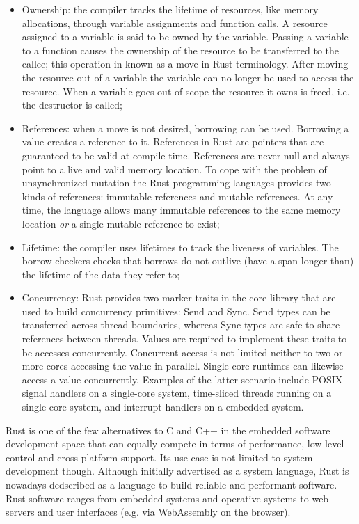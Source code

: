 \documentclass{ieeeaccess}
\begin{document}
\begin{itemize}
    \item Ownership: the compiler tracks the lifetime of resources, like memory allocations, through variable assignments and function calls. A resource assigned to a variable is said to be owned by the variable. Passing a variable to a function causes the ownership of the resource to be transferred to the callee; this operation in known as a move in Rust terminology. After moving the resource out of a variable the variable can no longer be used to access the resource. When a variable goes out of scope the resource it owns is freed, i.e. the destructor is called;
    \item References: when a move is not desired, borrowing can be used. Borrowing a value creates a reference to it. References in Rust are pointers that are guaranteed to be valid at compile time. References are never null and always point to a live and valid memory location. To cope with the problem of unsynchronized mutation the Rust programming languages provides two kinds of references: immutable references and mutable references. At any time, the language allows many immutable references to the same memory location \emph{or} a single mutable reference to exist;
    \item Lifetime: the compiler uses lifetimes to track the liveness of variables. The borrow checkers checks that borrows do not outlive (have a span longer than) the lifetime of the data they refer to;
    \item Concurrency: Rust provides two marker traits in the core library that are used to build concurrency primitives: Send and Sync. Send types can be transferred across thread boundaries, whereas Sync types are safe to share references between threads. Values are required to implement these traits to be accesses concurrently. Concurrent access is not limited neither to two or more cores accessing the value in parallel. Single core runtimes can likewise access a value concurrently. Examples of the latter scenario include POSIX signal handlers on a single-core system, time-sliced threads running on a single-core system, and interrupt handlers on a embedded system.
\end{itemize}

Rust is one of the few alternatives to C and C++ in the embedded software development space that can equally compete in terms of performance, low-level control and cross-platform support. Its use case is not limited to system development though. Although initially advertised as a system language, Rust is nowadays dedscribed as a language to build reliable and performant software. Rust software ranges from embedded systems and operative systems to web servers and user interfaces (e.g. via WebAssembly on the browser).
\end{document}
